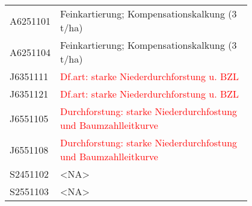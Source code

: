 \begin{singlespace}
{\begin{longtabu}{l p{0.8\linewidth}}
      A6251101 & Feinkartierung; Kompensationskalkung (3 t/ha) \\
      A6251104 & Feinkartierung; Kompensationskalkung (3 t/ha) \\
      J6351111 & \textcolor{red}{Df.art: starke Niederdurchforstung u. BZL} \\
      J6351121 & \textcolor{red}{Df.art: starke Niederdurchforstung u. BZL} \\
      J6551105 & \textcolor{red}{Durchforstung: starke Niederdurchfostung und Baumzahlleitkurve} \\
      J6551108 & \textcolor{red}{Durchforstung: starke Niederdurchfostung und Baumzahlleitkurve} \\
      S2451102 & <NA> \\
      S2551103 & <NA> \\
    \end{longtabu}
  }
\end{singlespace}


